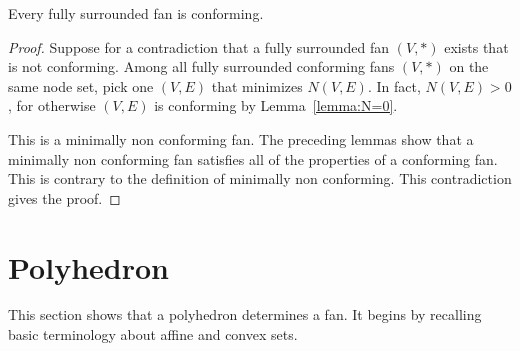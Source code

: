 %


\begin{lemma}[conformance]\label{lemma:face}
Every fully surrounded fan is conforming.
\end{lemma}

\begin{proof}
Suppose for a contradiction that a fully surrounded fan $(V,*)$
exists that is not conforming.  Among all fully surrounded
conforming fans $(V,*)$ on the same node set, pick one $(V,E)$
that minimizes $N(V,E)$.  In fact, $N(V,E)>0$, for otherwise $(V,E)$
is conforming by Lemma~\ref{lemma:N=0}.

This is a minimally non conforming fan.  The preceding lemmas show
that a minimally non conforming fan satisfies all of the properties
of a conforming fan.  This is contrary to the definition of
minimally non conforming.  This contradiction gives the proof.
\end{proof}



\section{Polyhedron}\label{sec:poly}

This section shows that a polyhedron determines a fan.  It begins by
recalling basic terminology about affine and convex sets.



